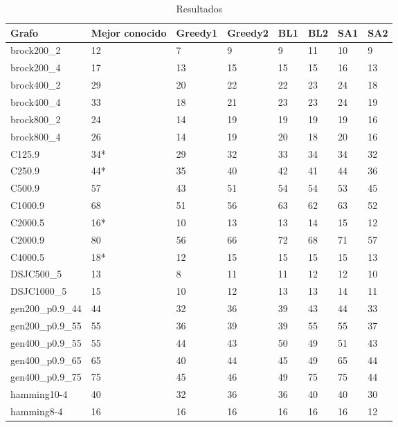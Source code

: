 \begin{table}[H]
\centering
\caption{Resultados}
\label{table:1}
\begin{tabular}{|l|l|l|l|l|l|l|l|}
\hline
Grafo              & Mejor conocido & Greedy1 & Greedy2 & BL1 & BL2 & SA1 & SA2 \\ \hline
brock200\_2        & 12 & 7 & 9 & 9 & 11 & 10 & 9 \\ \hline
brock200\_4        & 17 & 13 & 15 & 15 & 15 & 16 & 13 \\ \hline
brock400\_2        & 29 & 20 & 22 & 22 & 23 & 24 & 18 \\ \hline
brock400\_4        & 33 & 18 & 21 & 23 & 23 & 24 & 19 \\ \hline
brock800\_2        & 24 & 14 & 19 & 19 & 19 & 19 & 16 \\ \hline
brock800\_4        & 26 & 14 & 19 & 20 & 18 & 20 & 16 \\ \hline
C125.9             & 34* & 29 & 32 & 33 & 34 & 34 & 32 \\ \hline
C250.9             & 44* & 35 & 40 & 42 & 41 & 44 & 36 \\ \hline
C500.9             & 57 & 43 & 51 & 54 & 54 & 53 & 45 \\ \hline
C1000.9            & 68 & 51 & 56 & 63 & 62 & 63 & 52 \\ \hline
C2000.5            & 16* & 10 & 13 & 13 & 14 & 15 & 12 \\ \hline
C2000.9            & 80 & 56 & 66 & 72 & 68 & 71 & 57 \\ \hline
C4000.5            & 18* & 12 & 15 & 15 & 15 & 15 & 13 \\ \hline
DSJC500\_5         & 13 & 8 & 11 & 11 & 12 & 12 & 10 \\ \hline
DSJC1000\_5        & 15 & 10 & 12 & 13 & 13 & 14 & 11 \\ \hline
gen200\_p0.9\_44   & 44 & 32 & 36 & 39 & 43 & 44 & 33 \\ \hline
gen200\_p0.9\_55   & 55 & 36 & 39 & 39 & 55 & 55 & 37 \\ \hline
gen400\_p0.9\_55   & 55 & 44 & 43 & 50 & 49 & 51 & 43 \\ \hline
gen400\_p0.9\_65   & 65 & 40 & 44 & 45 & 49 & 65 & 44 \\ \hline
gen400\_p0.9\_75   & 75 & 45 & 46 & 49 & 75 & 75 & 44 \\ \hline
hamming10-4        & 40 & 32 & 36 & 36 & 40 & 40 & 30 \\ \hline
hamming8-4         & 16 & 16 & 16 & 16 & 16 & 16 & 12 \\ \hline

\end{tabular}
\end{table}
